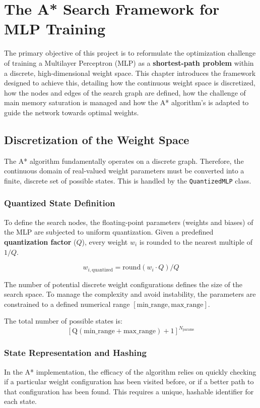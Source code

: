 \chapter{The A* Search Framework for MLP Training}
\label{chap:astar_framework}

The primary objective of this project is to reformulate the optimization challenge of training a Multilayer Perceptron (MLP) as a \textbf{shortest-path problem} within a discrete, high-dimensional weight space. This chapter introduces the framework designed to achieve this, detailing how the continuous weight space is discretized, how the nodes and edges of the search graph are defined, how the challenge of main memory saturation is managed and how the A* algorithm's is adapted to guide the network towards optimal weights.

\section{Discretization of the Weight Space}

The A* algorithm fundamentally operates on a discrete graph. Therefore, the continuous domain of real-valued weight parameters must be converted into a finite, discrete set of possible states. This is handled by the \texttt{QuantizedMLP} class.

\subsection{Quantized State Definition}
To define the search nodes, the floating-point parameters (weights and biases) of the MLP are subjected to uniform quantization. Given a predefined \textbf{quantization factor} ($Q$), every weight $w_i$ is rounded to the nearest multiple of $1/Q$.

$$w_{i, \text{quantized}} = \text{round}(w_i \cdot Q) / Q$$

The number of potential discrete weight configurations defines the size of the search space. To manage the complexity and avoid instability, the parameters are constrained to a defined numerical range $[\text{min\_range}, \text{max\_range}]$.

The total number of possible states is: 
$$[\text{Q} (\text{min\_range} + \text{max\_range}) + 1]^{N_{\text{params}}}$$

\subsection{State Representation and Hashing}
In the A* implementation, the efficacy of the algorithm relies on quickly checking if a particular weight configuration has been visited before, or if a better path to that configuration has been found. This requires a unique, hashable identifier for each state.

